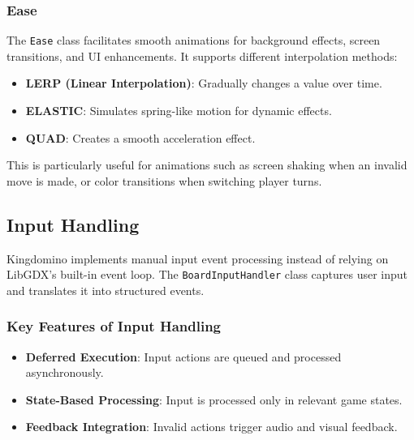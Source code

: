 \documentclass[conference]{IEEEtran}
\begin{document}
\subsubsection{Ease}
The \texttt{Ease} class facilitates smooth animations for background effects, screen transitions, and UI enhancements. It supports different interpolation methods:
\begin{itemize}
    \item \textbf{LERP (Linear Interpolation)}: Gradually changes a value over time.
    \item \textbf{ELASTIC}: Simulates spring-like motion for dynamic effects.
    \item \textbf{QUAD}: Creates a smooth acceleration effect.
\end{itemize}
This is particularly useful for animations such as screen shaking when an invalid move is made, or color transitions when switching player turns.

\subsection{Input Handling}
Kingdomino implements manual input event processing instead of relying on LibGDX’s built-in event loop. The \texttt{BoardInputHandler} class captures user input and translates it into structured events.

\subsubsection{Key Features of Input Handling}
\begin{itemize}
    \item \textbf{Deferred Execution}: Input actions are queued and processed asynchronously.
    \item \textbf{State-Based Processing}: Input is processed only in relevant game states.
    \item \textbf{Feedback Integration}: Invalid actions trigger audio and visual feedback.
\end{itemize}
\end{document}
